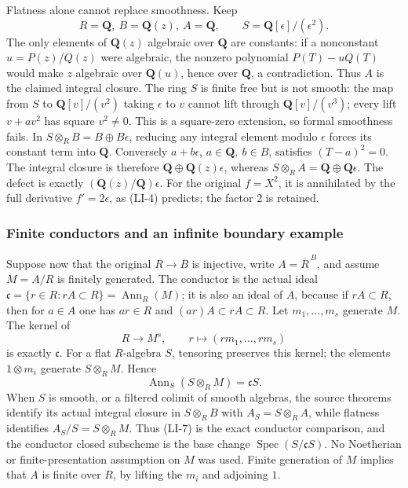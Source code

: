 Flatness alone cannot replace smoothness. Keep \[
R=\mathbf Q,\ B=\mathbf Q(z),\ A=\mathbf Q,\qquad
S=\mathbf Q[\epsilon]/(\epsilon^2).
\] The only elements of \(\mathbf Q(z)\) algebraic over \(\mathbf Q\) are constants: if a nonconstant \(u=P(z)/Q(z)\) were algebraic, the nonzero polynomial \(P(T)-uQ(T)\) would make \(z\) algebraic over \(\mathbf Q(u)\), hence over \(\mathbf Q\), a contradiction. Thus \(A\) is the claimed integral closure. The ring \(S\) is finite free but is not smooth: the map from \(S\) to \(\mathbf Q[v]/(v^2)\) taking \(\epsilon\) to \(v\) cannot lift through \(\mathbf Q[v]/(v^3)\); every lift \(v+av^2\) has square \(v^2\ne0\). This is a square-zero extension, so formal smoothness fails. In \(S\otimes_RB=B\oplus B\epsilon\), reducing any integral element modulo \(\epsilon\) forces its constant term into \(\mathbf Q\). Conversely \(a+b\epsilon\), \(a\in\mathbf Q,\ b\in B\), satisfies \((T-a)^2=0\). The integral closure is therefore \(\mathbf Q\oplus\mathbf Q(z)\epsilon\), whereas \(S\otimes_RA=\mathbf Q\oplus\mathbf Q\epsilon\). The defect is exactly \((\mathbf Q(z)/\mathbf Q)\epsilon\). For the original \(f=X^2\), it is annihilated by the full derivative \(f'=2\epsilon\), as (LI-4) predicts; the factor \(2\) is retained.

\subsubsection{Finite conductors and an infinite boundary example}\label{algebra-proof-054-finite-conductors-and-an-infinite-boundary-example}

Suppose now that the original \(R\to B\) is injective, write \(A=\overline R^{\,B}\), and assume \(M=A/R\) is finitely generated. The conductor is the actual ideal \(\mathfrak c=\{r\in R:rA\subset R\}=\operatorname{Ann}_R(M)\); it is also an ideal of \(A\), because if \(rA\subset R\), then for \(a\in A\) one has \(ar\in R\) and \((ar)A\subset rA\subset R\). Let \(m_1,\ldots,m_s\) generate \(M\). The kernel of \[
R\longrightarrow M^s,\qquad r\longmapsto(rm_1,\ldots,rm_s)
\] is exactly \(\mathfrak c\). For a flat \(R\)-algebra \(S\), tensoring preserves this kernel; the elements \(1\otimes m_i\) generate \(S\otimes_RM\). Hence \[
\operatorname{Ann}_S(S\otimes_RM)=\mathfrak cS.
\tag{LI-7}
\] When \(S\) is smooth, or a filtered colimit of smooth algebras, the source theorems identify its actual integral closure in \(S\otimes_R B\) with \(A_S=S\otimes_RA\), while flatness identifies \(A_S/S=S\otimes_RM\). Thus (LI-7) is the exact conductor comparison, and the conductor closed subscheme is the base change \(\operatorname{Spec}(S/\mathfrak cS)\). No Noetherian or finite-presentation assumption on \(M\) was used. Finite generation of \(M\) implies that \(A\) is finite over \(R\), by lifting the \(m_i\) and adjoining \(1\).

